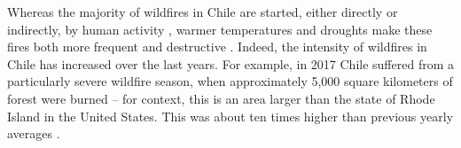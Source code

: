 \documentclass[11pt]{article}
\begin{document}
\begin{spacing}{1.5}
Whereas the majority of wildfires in Chile are started, either directly or indirectly, by human activity \citep{CONAF2022}, warmer temperatures and droughts make these fires both more frequent and destructive \citep{westerling2006warming}. Indeed, the intensity of wildfires in Chile has increased over the last years. For example, in 2017 Chile suffered from a particularly severe wildfire season, when approximately 5,000 square kilometers of forest were burned -- for context, this is an area larger than the state of Rhode Island in the United States. This was about ten times higher than previous yearly averages \citep{CONAF2022}.





\end{spacing}
\end{document}
